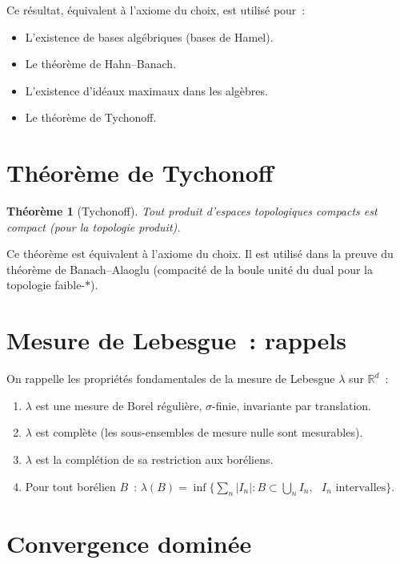 \documentclass[a4paper,12pt]{book}
\newcommand{\R}{\mathbb{R}}
\newcommand{\abs}[1]{\left| #1 \right|}
\theoremstyle{definition}
\theoremstyle{plain}
\newtheorem{theoreme}[definition]{Théorème}
\theoremstyle{remark}
\begin{document}
Ce résultat, équivalent à l'axiome du choix, est utilisé pour~:
\begin{itemize}
  \item L'existence de bases algébriques (bases de Hamel).
  \item Le théorème de Hahn--Banach.
  \item L'existence d'idéaux maximaux dans les algèbres.
  \item Le théorème de Tychonoff.
\end{itemize}

\section{Théorème de Tychonoff}

\begin{theoreme}[Tychonoff]
\label{thm:tychonoff}
Tout produit d'espaces topologiques compacts est compact (pour la topologie produit).
\end{theoreme}

Ce théorème est équivalent à l'axiome du choix. Il est utilisé dans la preuve du théorème
de Banach--Alaoglu (compacité de la boule unité
du dual pour la topologie faible-$*$).

\section{Mesure de Lebesgue~: rappels}

On rappelle les propriétés fondamentales de la mesure de Lebesgue $\lambda$ sur $\R^d$~:
\begin{enumerate}[label=(\roman*)]
  \item $\lambda$ est une mesure de Borel régulière, $\sigma$-finie, invariante par
        translation.
  \item $\lambda$ est complète (les sous-ensembles de mesure nulle sont mesurables).
  \item $\lambda$ est la complétion de sa restriction aux boréliens.
  \item Pour tout borélien $B$~: $\lambda(B) = \inf\{\sum_n \abs{I_n} : B \subset \bigcup_n I_n,
        \text{ $I_n$ intervalles}\}$.
\end{enumerate}

\section{Convergence dominée}
\end{document}
